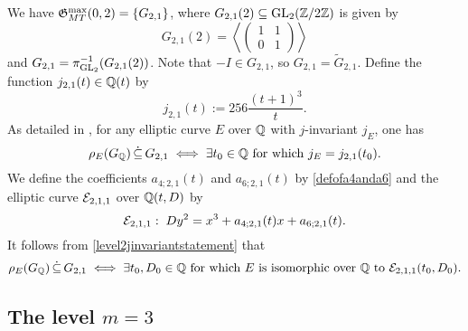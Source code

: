 We have $\mathfrak{G}_{MT}^{\max}(0,2) = \{ G_{2,1} \}$, where $G_{2,1}(2) \subseteq \operatorname{GL}_2(\mathbb{Z}/2\mathbb{Z})$ is given by
\[
G_{2,1}(2) = \left\langle \begin{pmatrix} 1 & 1 \\ 0 & 1 \end{pmatrix} \right\rangle
\]
and $G_{2,1} = \pi_{\operatorname{GL}_2}^{-1}(G_{2,1}(2))$. Note that $-I \in G_{2,1}$, so $G_{2,1} = \tilde{G}_{2,1}$. Define the function $j_{2,1}(t) \in \mathbb{Q}(t)$ by 
\[
j_{2,1}(t) := 256 \frac{(t+1)^3}{t}.
\]
As detailed in \cite{zywina}, for any elliptic curve $E$ over $\mathbb{Q}$ with $j$-invariant $j_E$, one has
\begin{equation} \label{level2jinvariantstatement}
\rho_{E}(G_{\mathbb{Q}}) \, \dot\subseteq \, G_{2,1} \; \Longleftrightarrow \; \exists t_0 \in \mathbb{Q} \text{ for which } j_E = j_{2,1}(t_0).
\end{equation}
We define the coefficients $a_{4;2,1}(t)$ and $a_{6;2,1}(t)$ by \eqref{defofa4anda6} and the elliptic curve $\mathcal{E}_{2,1,1}$ over $\mathbb{Q}(t,D)$ by
\[
\mathcal{E}_{2,1,1} : \; D y^2 = x^3 + a_{4;2,1}(t) x + a_{6;2,1}(t).
\]
It follows from \eqref{level2jinvariantstatement} that
\[
\rho_{E}(G_{\mathbb{Q}}) \, \dot\subseteq \, G_{2,1} \; \Longleftrightarrow \; \exists t_0, D_0 \in \mathbb{Q} \text{ for which } E \text{ is isomorphic over $\mathbb{Q}$ to } \mathcal{E}_{2,1,1}(t_0,D_0).
\]

\medskip

\subsection{The level \texorpdfstring{$m=3$}.}

